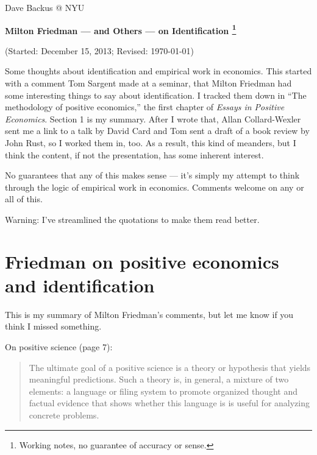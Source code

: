 \documentclass[11pt,letterpaper]{article}
\begin{document}
\bigskipamount
\parindent=0.0in
\thispagestyle{empty}
\begin{flushright} Dave Backus @ NYU \end{flushright}

\bigskip
\centerline{\Large \bf Milton Friedman --- and Others --- on Identification%
\footnote{Working notes, no guarantee of accuracy or sense.}
}
\centerline{(Started: December 15, 2013; Revised: \today)}

\bigskip
Some thoughts about identification and empirical work in economics.
This started with a comment Tom Sargent made at a seminar,
that Milton Friedman had some interesting things to say about identification.
I tracked them down in  ``The methodology of positive economics,''
the first chapter of  {\it Essays in Positive Economics\/}.
Section 1 is my summary.
After I wrote that, Allan Collard-Wexler
sent me a link to a talk by David Card
and Tom sent a draft of a book review by John Rust,
so I worked them in, too.
As a result, this kind of meanders, but I think the content,
if not the presentation, has some inherent interest.

No guarantees that any of this makes sense --- it's simply my attempt
to think through the logic of empirical work in economics.
Comments welcome on any or all of this.

Warning:  I've streamlined the quotations to make them read better.


\section{Friedman on positive economics and identification}

This is my summary of Milton Friedman's comments,
but let me know if you think I missed something.

On positive science (page 7):
\begin{quote}
The ultimate goal of a positive science is a theory or hypothesis
that yields meaningful predictions.
Such a theory is, in general, a mixture of two elements:
a language or filing system to promote organized thought
and factual evidence
that shows whether this language is is useful for analyzing
concrete problems.
\end{quote}
\end{document}
